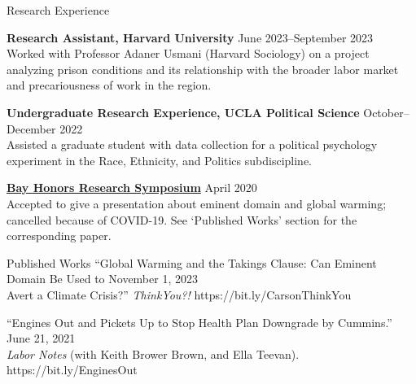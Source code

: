 \documentclass[
	11pt, %
]{resume} %
\begin{document}
\begin{samepage}
\begin{rSection}{Research Experience}
%

\textbf{Research Assistant, Harvard University} \hfill June 2023--September 2023\\
Worked with Professor Adaner Usmani (Harvard Sociology) on a project analyzing prison conditions and its relationship with the broader labor market and precariousness of work in the region.

\textbf{Undergraduate Research Experience, UCLA Political Science} \hfill October--December 2022\\
Assisted a graduate student with data collection for a political psychology experiment in the Race, Ethnicity, and Politics subdiscipline.

\href{https://bayhonors.org/}{\textbf{Bay Honors Research Symposium}} \hfill April 2020\\
Accepted to give a presentation about eminent domain and global warming; cancelled because
of COVID-19. See ‘Published Works’ section for the corresponding paper.

\end{rSection}
\end{samepage}
\begin{samepage}
\begin{rSection}{Published Works}
“Global Warming and the Takings Clause: Can Eminent Domain Be Used to \hfill November 1, 2023 \\
Avert a Climate Crisis?” \textit{ThinkYou?!} https://bit.ly/CarsonThinkYou

“Engines Out and Pickets Up to Stop Health Plan Downgrade by Cummins.” \hfill June 21, 2021 \\
\textit{Labor Notes} (with Keith Brower Brown, and Ella Teevan). https://bit.ly/EnginesOut

\end{rSection}
\end{samepage}
\end{document}
